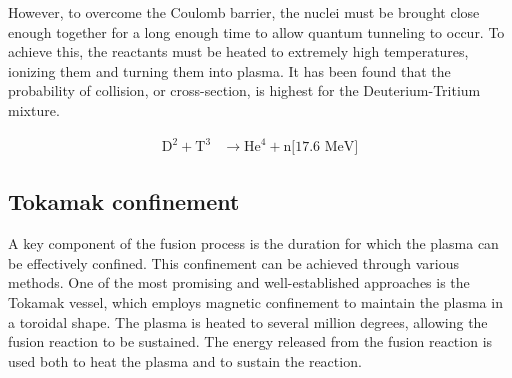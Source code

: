 \documentclass[11pt,openany]{report}
\begin{document}
\begin{multicols}{2}
    However, to overcome the Coulomb barrier, the nuclei must be brought close enough together for a long enough time to allow quantum tunneling to occur. To achieve this, the reactants must be heated to extremely high temperatures, ionizing them and turning them into plasma. It has been found that the probability of collision, or cross-section, is highest for the Deuterium-Tritium mixture.

    \begin{align*}
        \text{D}^2 + \text{T}^3 & \rightarrow \text{He}^4 + \text{n[17.6 MeV]}
    \end{align*}
    \subsection{Tokamak confinement}
    A key component of the fusion process is the duration for which the plasma can be effectively confined. This confinement can be achieved through various methods. One of the most promising and well-established approaches is the Tokamak vessel, which employs magnetic confinement to maintain the plasma in a toroidal shape. The plasma is heated to several million degrees, allowing the fusion reaction to be sustained. The energy released from the fusion reaction is used both to heat the plasma and to sustain the reaction.


\end{multicols}
\end{document}
